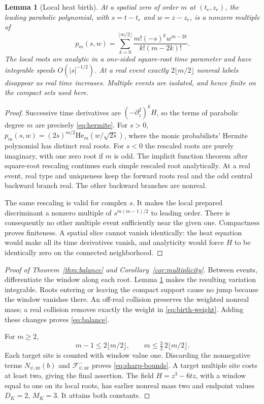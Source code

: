 \documentclass[11pt]{article}
\newcommand{\nr}{\mathrm{nr}}
\newcommand{\FF}{\mathcal F}
\newtheorem{lemma}[theorem]{Lemma}
\theoremstyle{remark}
\begin{document}
\begin{lemma}[Local heat birth]
\label{lem:birth}
At a spatial zero of order $m$ at $(t_e,z_e)$, the leading parabolic
polynomial, with $s=t-t_e$ and $w=z-z_e$, is a nonzero multiple of
\begin{equation}
 p_m(s,w)=\sum_{k=0}^{\lfloor m/2\rfloor}
 \frac{m!(-s)^k w^{m-2k}}{k!(m-2k)!}.
 \label{eq:hermite}
\end{equation}
The local roots are analytic in a one-sided square-root time parameter
and have integrable speeds $O(|s|^{-1/2})$. At a real event exactly
$2\lfloor m/2\rfloor$ nonreal labels disappear as real time increases.
Multiple events are isolated, and hence finite on the compact sets used
here.
\end{lemma}
\begin{proof}
Successive time derivatives are $(-\partial_z^2)^kH$, so the terms of
parabolic degree $m$ are precisely \eqref{eq:hermite}. For $s>0$,
$p_m(s,w)=(2s)^{m/2}\mathrm{He}_m(w/\sqrt{2s})$, where the monic
probabilists' Hermite polynomial has distinct real roots. For $s<0$ the
rescaled roots are purely imaginary, with one zero root if $m$ is odd.
The implicit function theorem after square-root rescaling continues each
simple rescaled root analytically. At a real event, real type and
uniqueness keep the forward roots real and the odd central backward
branch real. The other backward branches are nonreal.

The same rescaling is valid for complex $s$. It makes the local prepared
discriminant a nonzero multiple of
$s^{m(m-1)/2}$ to leading order. There is consequently no other multiple
event sufficiently near the given one. Compactness proves finiteness.
A spatial slice cannot vanish identically: the heat equation would make
all its time derivatives vanish, and analyticity would force $H$ to be
identically zero on the connected neighborhood.
\end{proof}

\begin{proof}[Proof of Theorem~\ref{thm:balance} and
Corollary~\ref{cor:multiplicity}]
Between events, differentiate the window along each root. Lemma
\ref{lem:birth} makes the resulting variation integrable. Roots entering
or leaving the compact support cause no jump because the window vanishes
there. An off-real collision preserves the weighted nonreal mass; a real
collision removes exactly the weight in \eqref{eq:birth-weight}.
Adding these changes proves \eqref{eq:balance}.

For $m\ge2$,
\[
 m-1\le2\lfloor m/2\rfloor,
 \qquad m\le\tfrac32\,2\lfloor m/2\rfloor.
\]
Each target site is counted with window value one. Discarding the
nonnegative terms $N_{\psi,\nr}(b)$ and $\FF^-_{\psi,\nr}$ proves
\eqref{eq:sharp-bounds}. A target multiple site costs at least two,
giving the final assertion. The field $H=z^3-6tz$, with a window equal
to one on its local roots, has earlier nonreal mass two and endpoint
values $D_K=2$, $M_K=3$. It attains both constants.
\end{proof}
\end{document}
